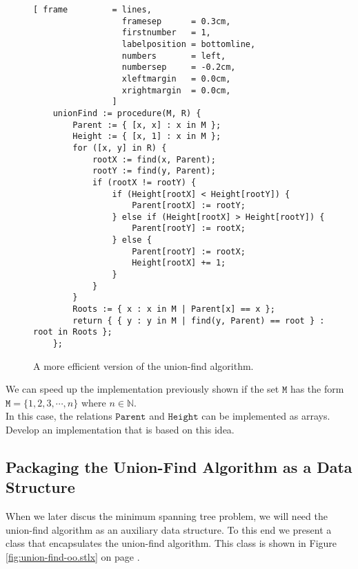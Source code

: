 \begin{figure}[!ht]
\centering
\begin{Verbatim}[ frame         = lines, 
                  framesep      = 0.3cm, 
                  firstnumber   = 1,
                  labelposition = bottomline,
                  numbers       = left,
                  numbersep     = -0.2cm,
                  xleftmargin   = 0.0cm,
                  xrightmargin  = 0.0cm,
                ]
    unionFind := procedure(M, R) {
        Parent := { [x, x] : x in M };
        Height := { [x, 1] : x in M };
        for ([x, y] in R) {
            rootX := find(x, Parent);
            rootY := find(y, Parent);
            if (rootX != rootY) {
                if (Height[rootX] < Height[rootY]) {
                    Parent[rootX] := rootY;  
                } else if (Height[rootX] > Height[rootY]) {
                    Parent[rootY] := rootX;  
                } else {
                    Parent[rootY] := rootX;  
                    Height[rootX] += 1;
                }
            }
        }
        Roots := { x : x in M | Parent[x] == x };
        return { { y : y in M | find(y, Parent) == root } : root in Roots };
    };
\end{Verbatim}
\vspace*{-0.3cm}
\caption{A more efficient version of the union-find algorithm.}
\label{fig:union-find.stlx}
\end{figure}

\exercise
We can speed up the implementation previously shown if the set $\mathtt{M}$ has the form
\\[0.2cm]
\hspace*{1.3cm}
$\mathtt{M} = \{ 1, 2, 3, \cdots, n \}$ \quad where $n \in \mathbb{N}$.
\\[0.2cm]
In this case, the relations $\mathtt{Parent}$ and $\mathtt{Height}$ can be implemented as arrays.
Develop an implementation that is based on this idea.
\eox

\subsection{Packaging the  Union-Find Algorithm as a Data Structure}
When we later discus  the minimum spanning tree problem,  we will need the union-find algorithm as an
auxiliary data structure.  To this end we present a class that encapsulates the union-find
algorithm.  This class is shown in Figure \ref{fig:union-find-oo.stlx} on page
\pageref{fig:union-find-oo.stlx}.

